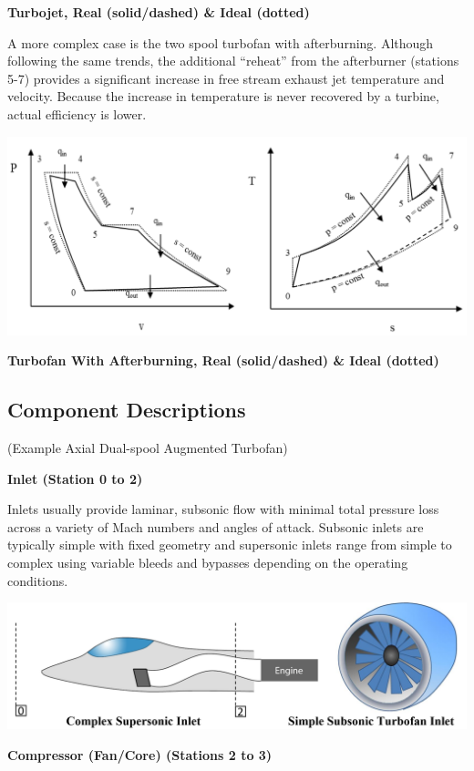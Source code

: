 \documentclass[
]{book}
\begin{document}
\textbf{Turbojet, Real (solid/dashed) \& Ideal (dotted)}

A more complex case is the two spool turbofan with afterburning. Although
following the same trends, the additional ``reheat'' from the afterburner
(stations 5-7) provides a significant increase in free stream exhaust jet
temperature and velocity. Because the increase in temperature is never recovered
by a turbine, actual efficiency is lower.

\includegraphics{media/17/p-v-t-s-ab.png}

\textbf{Turbofan With Afterburning, Real (solid/dashed) \& Ideal (dotted)}

\hypertarget{component-descriptions}{%
\subsection{Component Descriptions}\label{component-descriptions}}

(Example Axial Dual-spool Augmented Turbofan)

\textbf{Inlet (Station 0 to 2)}

Inlets usually provide laminar, subsonic flow with minimal total pressure loss
across a variety of Mach numbers and angles of attack. Subsonic inlets are
typically simple with fixed geometry and supersonic inlets range from simple to
complex using variable bleeds and bypasses depending on the operating
conditions.

\includegraphics{media/17/inlets.png}

\textbf{Compressor (Fan/Core) (Stations 2 to 3)}
\end{document}
